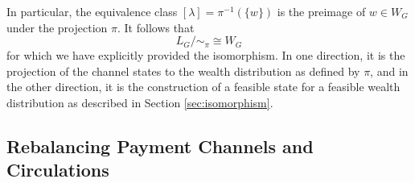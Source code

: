 \documentclass[10pt,twocolumn]{article}
\newtheorem{definition}{Definition}[section]
\begin{document}
In particular, the equivalence class \( [\lambda] = \pi^{-1}(\{w\}) \) is the preimage of \( w \in W_G \) under the projection \( \pi \).  
It follows that
\begin{equation}
  L_G / \sim_{\pi} \cong W_G
\end{equation}
for which we have explicitly provided the isomorphism.  
In one direction, it is the projection of the channel states to the wealth distribution as defined by \( \pi \), and in the other direction, it is the construction of a feasible state for a feasible wealth distribution as described in Section \ref{sec:isomorphism}.

\subsection{Rebalancing Payment Channels and Circulations}


\end{document}
